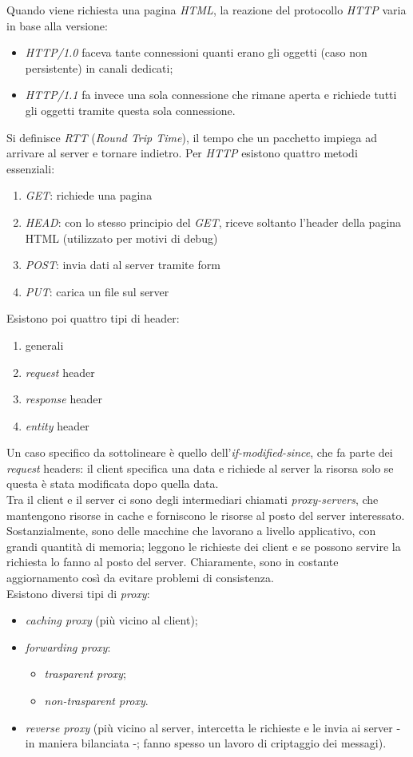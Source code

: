 Quando viene richiesta una pagina \textit{HTML}, la reazione del protocollo \textit{HTTP} varia in base alla versione:
\begin{itemize}
    \item \textit{HTTP/1.0} faceva tante connessioni quanti erano gli oggetti (caso non persistente) in canali dedicati;
    \item \textit{HTTP/1.1} fa invece una sola connessione che rimane aperta e richiede tutti gli oggetti tramite questa sola connessione.
\end{itemize}
Si definisce \textit{RTT} (\textit{Round Trip Time}), il tempo che un pacchetto impiega ad arrivare al server e tornare indietro.
Per \textit{HTTP} esistono quattro metodi essenziali:
\begin{enumerate}
    \item \textit{GET}: richiede una pagina
    \item \textit{HEAD}: con lo stesso principio del \textit{GET}, riceve soltanto l'header della pagina HTML (utilizzato per motivi di debug)
    \item \textit{POST}: invia dati al server tramite form
    \item \textit{PUT}: carica un file sul server
\end{enumerate}
Esistono poi quattro tipi di header:
\begin{enumerate}
    \item generali
    \item \textit{request} header
    \item \textit{response} header
    \item \textit{entity} header
\end{enumerate}
Un caso specifico da sottolineare è quello dell'\textit{if-modified-since}, che fa parte dei \textit{request} headers: il client specifica una data e richiede al server la risorsa solo se questa è stata modificata dopo quella data. \\
Tra il client e il server ci sono degli intermediari chiamati \textit{proxy-servers}, che mantengono risorse in cache e forniscono le risorse al posto del server interessato. Sostanzialmente, sono delle macchine che lavorano a livello applicativo, con grandi quantità di memoria; leggono le richieste dei client e se possono servire la richiesta lo fanno al posto del server. Chiaramente, sono in costante aggiornamento così da evitare problemi di consistenza. \\
Esistono diversi tipi di \textit{proxy}:
\begin{itemize}
    \item \textit{caching proxy} (più vicino al client);
    \item \textit{forwarding proxy}:
    \begin{itemize}
        \item \textit{trasparent proxy};
        \item \textit{non-trasparent proxy}.
    \end{itemize}
    \item \textit{reverse proxy} (più vicino al server, intercetta le richieste e le invia ai server - in maniera bilanciata -; fanno spesso un lavoro di criptaggio dei messagi).
\end{itemize}
